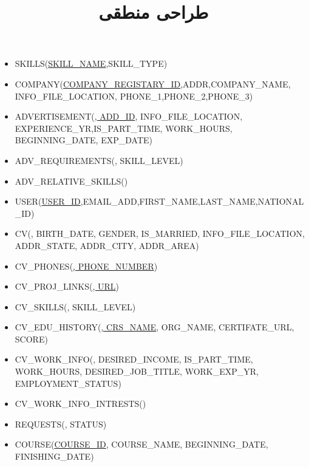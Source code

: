 \documentclass{article}
\title{طراحی منطقی}
\date{}
\begin{document}
\maketitle
\begin{flushleft}
    
    \begin{latin}
        \begin{itemize}
            \item SKILLS(\underline{SKILL\_NAME},SKILL\_TYPE)
            \item COMPANY(\underline{COMPANY\_REGISTARY\_ID},ADDR,COMPANY\_NAME, INFO\_FILE\_LOCATION, PHONE\_1,PHONE\_2,PHONE\_3)
            \item ADVERTISEMENT(\underline{, ADD\_ID}, INFO\_FILE\_LOCATION, EXPERIENCE\_YR,IS\_PART\_TIME, WORK\_HOURS, BEGINNING\_DATE, EXP\_DATE)
            \item ADV\_REQUIREMENTS(\underline{}, SKILL\_LEVEL)
            \item ADV\_RELATIVE\_SKILLS(\underline{})
            \item USER(\underline{USER\_ID},EMAIL\_ADD,FIRST\_NAME,LAST\_NAME,NATIONAL\_ID)
            \item CV(\underline{}, BIRTH\_DATE, GENDER, IS\_MARRIED, INFO\_FILE\_LOCATION, ADDR\_STATE, ADDR\_CITY, ADDR\_AREA)
            \item CV\_PHONES(\underline{, PHONE\_NUMBER})
            \item CV\_PROJ\_LINKS(\underline{, URL})
            \item CV\_SKILLS(\underline{}, SKILL\_LEVEL)
            \item CV\_EDU\_HISTORY(\underline{, CRS\_NAME}, ORG\_NAME, CERTIFATE\_URL, SCORE)
            \item CV\_WORK\_INFO(\underline{}, DESIRED\_INCOME, IS\_PART\_TIME, WORK\_HOURS, DESIRED\_JOB\_TITLE, WORK\_EXP\_YR, EMPLOYMENT\_STATUS)
            \item CV\_WORK\_INFO\_INTRESTS(\underline{})
            \item REQUESTS(\underline{}, STATUS)
            \item COURSE(\underline{COURSE\_ID}, COURSE\_NAME, BEGINNING\_DATE, FINISHING\_DATE)

\end{itemize}
\end{latin}
\end{flushleft}
\end{document}
